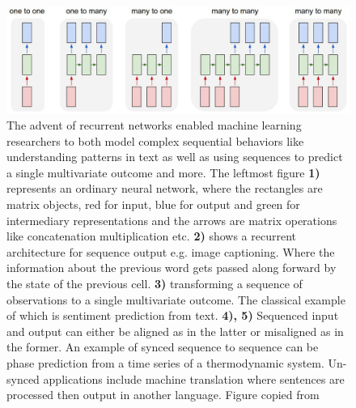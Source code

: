 \begin{figure}
\centering
\includegraphics[width=\textwidth]{../figures/ann_types}
\caption{The advent of recurrent networks enabled machine learning researchers to both model complex sequential behaviors like understanding patterns in text as well as using sequences to predict a single multivariate outcome and more. The leftmost figure \textbf{1)} represents an ordinary neural network, where the rectangles are matrix objects, red for input, blue for output and green for intermediary representations and the arrows are matrix operations like concatenation multiplication etc. \textbf{2)} shows a recurrent architecture for sequence output e.g. image captioning. Where the information about the previous word gets passed along forward by the state of the previous cell. \textbf{3)} transforming a sequence of observations to a single multivariate outcome. The classical example of which is sentiment prediction from text. \textbf{4), 5)} Sequenced input and output can either be aligned as in the latter or misaligned as in the former. An example of synced sequence to sequence can be phase prediction from a time series of a thermodynamic system. Un-synced applications include machine translation where sentences are processed then output in another language. Figure copied from \cite{Karpathy2015}}\label{fig:ann_architectures}
\end{figure}